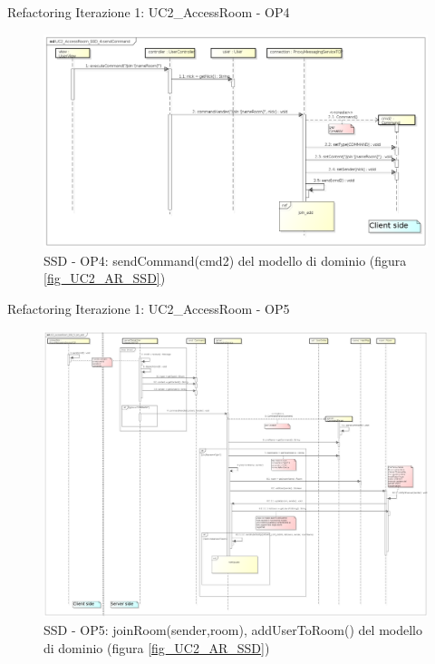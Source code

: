 \documentclass[t]{beamer} %
\begin{document}
\begin{frame} {Refactoring Iterazione 1: UC2\_AccessRoom - OP4}
   \begin{figure}
     \includegraphics[scale=0.26]{image_astah/Iteration_1_DesignModel_Refactored/UC2_AccessRoom_SSD_4_sendCommand.png}{\centering}
     \caption{SSD - OP4: sendCommand(cmd2) del modello di dominio (figura \ref{fig_UC2_AR_SSD}) }
     \label{fig_UC2_SSDR_AC_4} 
   \end{figure}
\end{frame}

\begin{frame} {Refactoring Iterazione 1: UC2\_AccessRoom - OP5}
   \begin{figure}
     \includegraphics[scale=0.0999]{image_astah/Iteration_1_DesignModel_Refactored/UC2_AccessRoom_SSD_5_join_add.png}{\centering}
     \caption{SSD - OP5: joinRoom(sender,room), addUserToRoom() del modello di dominio (figura \ref{fig_UC2_AR_SSD}) }
     \label{fig_UC2_SSDR_AC_5} 
   \end{figure}
\end{frame}
\end{document}
